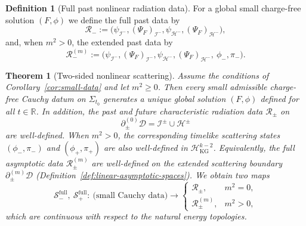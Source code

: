\documentclass[11pt]{article}
\numberwithin{equation}{section}
\theoremstyle{plain}
\newtheorem{theorem}{Theorem}[section]
\theoremstyle{definition}
\newtheorem{definition}{Definition}[section]
\theoremstyle{remark}
\newcommand{\D}{\mathcal{D}}
\begin{document}
\begin{definition}[Full past nonlinear radiation data]\label{def:past-radiation-data}
For a global small charge-free solution $(F,\phi)$ we define the full past data by
\begin{equation}
\mathcal R_{-}
:=
\bigl(\psi_{\mathcal I^-},(\Psi_F)_{\mathcal I^-},\psi_{\mathcal H^-},(\Psi_F)_{\mathcal H^-}\bigr),
\end{equation}
and, when $m^{2}>0$, the extended past data by
\begin{equation}
\mathcal R_{-}^{(m)}
:=
\bigl(\psi_{\mathcal I^-},(\Psi_F)_{\mathcal I^-},\psi_{\mathcal H^-},(\Psi_F)_{\mathcal H^-},\ \phi_{-},\pi_{-}\bigr).
\end{equation}
\end{definition}

\begin{theorem}[Two-sided nonlinear scattering]\label{thm:two-sided-scattering}
Assume the conditions of Corollary~\ref{cor:small-data} and let $m^{2}\ge 0$.
Then every small admissible charge-free Cauchy datum on $\Sigma_{t_0}$ generates a unique global solution $(F,\phi)$ defined for all $t\in\mathbb R$.
In addition, the past and future characteristic radiation data $\mathcal R_{\pm}$ on
\begin{equation}
\partial_{\pm}^{(0)}\D=\mathcal I^{\pm}\cup\mathcal H^{\pm}
\end{equation}
are well-defined.
When $m^{2}>0$, the corresponding timelike scattering states $(\phi_{-},\pi_{-})$ and $(\phi_{+},\pi_{+})$ are also well-defined in $\mathcal H_{\mathrm{KG}}^{k-2}$.
Equivalently, the full asymptotic data $\mathcal R_{\pm}^{(m)}$ are well-defined on the extended scattering boundary $\partial_{\pm}^{(m)}\D$ (Definition~\ref{def:linear-asymptotic-spaces}).
We obtain two maps
\begin{equation}
\mathscr S_{-}^{\mathrm{full}},\ \mathscr S_{+}^{\mathrm{full}}:
\ \text{(small Cauchy data)}\longrightarrow
\begin{cases}
\mathcal R_{\pm}, & m^{2}=0,\\
\mathcal R_{\pm}^{(m)}, & m^{2}>0,
\end{cases}
\end{equation}
which are continuous with respect to the natural energy topologies.
\end{theorem}
\end{document}

